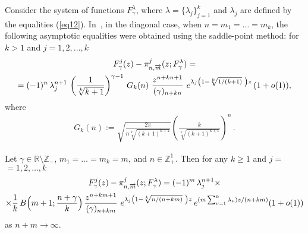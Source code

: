 \documentclass[
11pt,%
tightenlines,%
twoside,%
onecolumn,%
nofloats,%
nobibnotes,%
nofootinbib,%
superscriptaddress,%
noshowpacs,%
centertags]%
{revtex4}
\begin{document}
Consider the system of functions $F^{\lambda}_\gamma$, where
$\lambda=\{\lambda_j\}_{j=1}^k$ and $\lambda_j$ are defined
by the equalities (\ref{eq12}). In~\cite{Star1},
in the diagonal case, when $n=m_1=\ldots=m_k$, the
following asymptotic equalities were obtained using
the saddle-point method: for $k>1$ and $j=1,2,...,k$
\begin{gather}
F^j_\gamma(z)-\pi_{n, \overrightarrow{m}}^j(z;F^{\lambda}_\gamma)=\notag\\
=(-1)^{n}\,\lambda_j^{n+1}\,\left(\frac{1}{\sqrt[k]{k+1}}\right)^{\gamma-1}\,G_k(n)\,\,
\frac{z^{n+kn+1}}{(\gamma)_{n+kn}}\,\,e^{\lambda_j\left(1-\sqrt[k]{1/(k+1)}\,\,\right)z}
\,(1+o(1))\label{eq14},
\end{gather}
where
\begin{eqnarray*}
G_k(n):=\sqrt{\frac{2\pi}{n\sqrt[k]{(k+1)^{k+2}}}}
\left(\frac{k}{\sqrt[k]{(k+1)^{k+1}}}\right)^n\,.
\end{eqnarray*}
\begin{theorem}\label{th3}
Let $\gamma\in\mathbb{R}\setminus \mathbb{Z_{-}}$, $m_1=\ldots=m_k=m$,
and $n\in \mathbb{Z}^1_+$. Then for any $k\geqslant1$ and $j=$ $=1,2,\ldots,k$
\begin{gather}
F^j_\gamma(z)-\pi_{n,
\overrightarrow{m}}^j(z;F^{\lambda}_\gamma)=(-1)^{m}\,
\lambda_j^{n+1}\times\notag\\
\times\frac{1}{k}\,B\Bigl(m+1;\frac{n+\gamma}{k}\Bigl)\,
\frac{z^{n+km+1}}{(\gamma)_{n+km}}\,\,e^{\lambda_j\left(1-\sqrt[k]{n/(n+km)}\,\,\right)z}\,
e^{(m\sum_{\nu=1}^{k}\lambda_{\nu})z/(n+km)}(1+o(1))\label{eq15}
\end{gather}
as $n+m\rightarrow\infty$.
\end{theorem}
\end{document}
